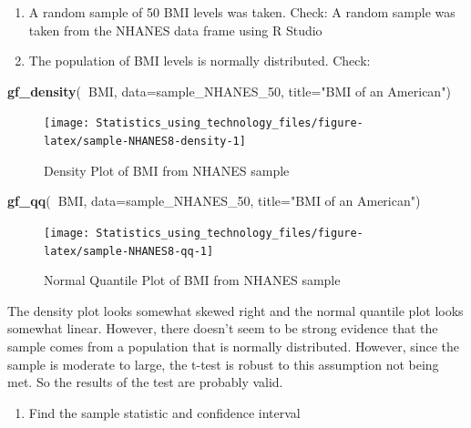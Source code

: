 \documentclass[
]{book}
\newenvironment{Shaded}{\begin{snugshade}}{\end{snugshade}}
\newcommand{\DataTypeTok}[1]{\textcolor[rgb]{0.13,0.29,0.53}{#1}}
\newcommand{\DecValTok}[1]{\textcolor[rgb]{0.00,0.00,0.81}{#1}}
\newcommand{\KeywordTok}[1]{\textcolor[rgb]{0.13,0.29,0.53}{\textbf{#1}}}
\newcommand{\NormalTok}[1]{#1}
\newcommand{\OperatorTok}[1]{\textcolor[rgb]{0.81,0.36,0.00}{\textbf{#1}}}
\newcommand{\StringTok}[1]{\textcolor[rgb]{0.31,0.60,0.02}{#1}}
\providecommand{\tightlist}{%
  \setlength{\itemsep}{0pt}\setlength{\parskip}{0pt}}
\begin{document}
\begin{enumerate}
\def\labelenumi{\alph{enumi}.}
\item
  A random sample of 50 BMI levels was taken. Check: A random sample was taken from the NHANES data frame using R Studio
\item
  The population of BMI levels is normally distributed. Check:
\end{enumerate}



\begin{Shaded}
\begin{Highlighting}[]
\KeywordTok{gf_density}\NormalTok{(}\OperatorTok{~}\NormalTok{BMI, }\DataTypeTok{data=}\NormalTok{sample_NHANES_}\DecValTok{50}\NormalTok{, }\DataTypeTok{title=}\StringTok{"BMI of an American"}\NormalTok{)}
\end{Highlighting}
\end{Shaded}

\begin{figure}
\texttt{[image: Statistics\_using\_technology\_files/figure-latex/sample-NHANES8-density-1]} \caption{Density Plot of BMI from NHANES sample}\label{fig:sample-NHANES8-density}
\end{figure}



\begin{Shaded}
\begin{Highlighting}[]
\KeywordTok{gf_qq}\NormalTok{(}\OperatorTok{~}\NormalTok{BMI, }\DataTypeTok{data=}\NormalTok{sample_NHANES_}\DecValTok{50}\NormalTok{, }\DataTypeTok{title=}\StringTok{"BMI of an American"}\NormalTok{)}
\end{Highlighting}
\end{Shaded}

\begin{figure}
\texttt{[image: Statistics\_using\_technology\_files/figure-latex/sample-NHANES8-qq-1]} \caption{Normal Quantile Plot of BMI from NHANES sample}\label{fig:sample-NHANES8-qq}
\end{figure}

The density plot looks somewhat skewed right and the normal quantile plot looks somewhat linear. However, there doesn't seem to be strong evidence that the sample comes from a population that is normally distributed. However, since the sample is moderate to large, the t-test is robust to this assumption not being met. So the results of the test are probably valid.

\begin{enumerate}
\def\labelenumi{\arabic{enumi}.}
\setcounter{enumi}{3}
\tightlist
\item
  Find the sample statistic and confidence interval
\end{enumerate}
\end{document}
